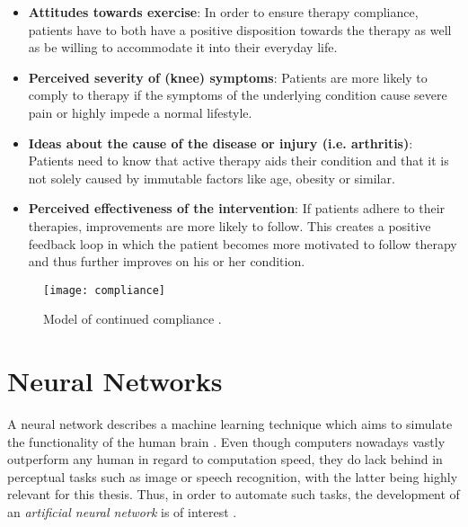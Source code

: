 \documentclass[draft,final]{vutinfth} %
\begin{document}
\begin{itemize}
\item\textbf{Attitudes towards exercise}:  In order to ensure therapy compliance, patients have to both have a positive disposition towards the therapy as well as be willing to accommodate it into their everyday life.
\item\textbf{Perceived severity of (knee) symptoms}: Patients are more likely to comply to therapy if the symptoms of the underlying condition cause severe pain or highly impede a normal lifestyle.
\item\textbf{Ideas about the cause of the disease or injury (i.e. arthritis)}:  Patients need to know that active therapy aids their condition and that it is not solely caused by immutable factors like age, obesity or similar.
\item\textbf{Perceived effectiveness of the intervention}: If patients adhere to their therapies, improvements are more likely to follow. This creates a positive feedback loop in which the patient becomes more motivated to follow therapy and thus further improves on his or her condition.
\end{itemize}

\begin{figure}
\label{fig:compliance}
\begin{center}
\texttt{[image: compliance]}
\end{center}
\caption{Model of continued compliance \cite{campbell2001don}.}
\end{figure}
\section{Neural Networks}
A neural network describes a machine learning technique which aims to simulate the functionality of the human brain \cite{suryadevara2021comprehensive}. Even though computers nowadays vastly outperform any human in regard to computation speed, they do lack behind in perceptual tasks such as image or speech recognition, with the latter being highly relevant for this thesis. Thus, in order to automate such tasks, the development of an \emph{artificial neural network} is of interest \cite{zou2009overview}. \\
\end{document}
